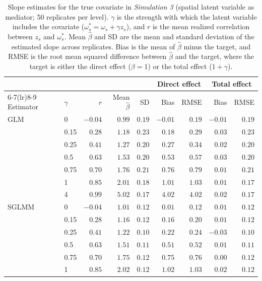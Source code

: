 \begin{table}[ht]
\centering
\small
\caption{Slope estimates for the true covariate in \textit{Simulation 3} (spatial latent variable as mediator; 50 replicates per level). $\gamma$ is the strength with which the latent variable includes the covariate ($\omega^*_s = \omega_s + \gamma z_s$), and $r$ is the mean realized correlation between $z_s$ and $\omega^*_s$. Mean $\hat{\beta}$ and SD are the mean and standard deviation of the estimated slope across replicates. Bias is the mean of $\hat{\beta}$ minus the target, and RMSE is the root mean squared difference between $\hat{\beta}$ and the target, where the target is either the direct effect ($\beta = 1$) or the total effect ($1 + \gamma$).}
\label{tab:sim3_estimand}
\begin{tabular}{llrrrrrrr}
\toprule
 & & & & & \multicolumn{2}{c}{Direct effect} & \multicolumn{2}{c}{Total effect} \\
\cmidrule(lr){6-7}\cmidrule(lr){8-9}
Estimator & $\gamma$ & $r$ & Mean $\hat{\beta}$ & SD & Bias & RMSE & Bias & RMSE \\
\midrule
GLM & 0 & $-0.04$ & $0.99$ & $0.19$ & $-0.01$ & $0.19$ & $-0.01$ & $0.19$ \\
 & 0.15 & $0.28$ & $1.18$ & $0.23$ & $0.18$ & $0.29$ & $0.03$ & $0.23$ \\
 & 0.25 & $0.41$ & $1.27$ & $0.20$ & $0.27$ & $0.34$ & $0.02$ & $0.20$ \\
 & 0.5 & $0.63$ & $1.53$ & $0.20$ & $0.53$ & $0.57$ & $0.03$ & $0.20$ \\
 & 0.75 & $0.70$ & $1.76$ & $0.21$ & $0.76$ & $0.79$ & $0.01$ & $0.21$ \\
 & 1 & $0.85$ & $2.01$ & $0.18$ & $1.01$ & $1.03$ & $0.01$ & $0.17$ \\
 & 4 & $0.99$ & $5.02$ & $0.17$ & $4.02$ & $4.02$ & $0.02$ & $0.17$ \\
\addlinespace
SGLMM & 0 & $-0.04$ & $1.01$ & $0.12$ & $0.01$ & $0.12$ & $0.01$ & $0.12$ \\
 & 0.15 & $0.28$ & $1.16$ & $0.12$ & $0.16$ & $0.20$ & $0.01$ & $0.12$ \\
 & 0.25 & $0.41$ & $1.22$ & $0.10$ & $0.22$ & $0.24$ & $-0.03$ & $0.10$ \\
 & 0.5 & $0.63$ & $1.51$ & $0.11$ & $0.51$ & $0.52$ & $0.01$ & $0.11$ \\
 & 0.75 & $0.70$ & $1.75$ & $0.12$ & $0.75$ & $0.76$ & $0.00$ & $0.12$ \\
 & 1 & $0.85$ & $2.02$ & $0.12$ & $1.02$ & $1.03$ & $0.02$ & $0.12$ \\

\end{tabular}
\end{table}
